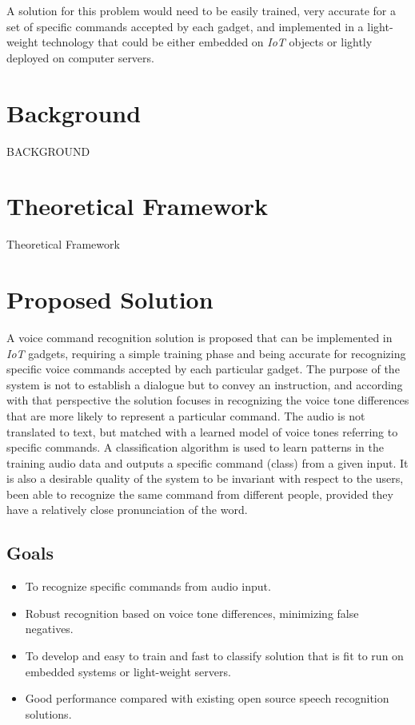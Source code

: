 \documentclass[anon]{CI}
\begin{document}
A solution for this problem would need to be easily trained, very accurate for a set of specific commands accepted by each gadget, and implemented in a light-weight technology that could be either embedded on \emph{IoT} objects or lightly deployed on computer servers.

\section{Background}
BACKGROUND

\section{Theoretical Framework}
Theoretical Framework 


\section{Proposed Solution}

A voice command recognition solution is proposed that can be implemented in \emph{IoT} gadgets, requiring a simple training phase and being accurate for recognizing specific voice commands accepted by each particular gadget. The purpose of the system is not to establish a dialogue but to convey an instruction, and according with that perspective the solution focuses in recognizing the voice tone differences that are more likely to represent a particular command. The audio is not translated to text, but matched with a learned model of voice tones referring to specific commands. A classification algorithm is used to learn patterns in the training audio data and outputs a specific command (class) from a given input. It is also a desirable quality of the system to be invariant with respect to the users, been able to recognize the same command from different people, provided they have a relatively close pronunciation of the word.

\subsection{Goals}
\begin{itemize}
	\item To recognize specific commands from audio input.
	\item Robust recognition based on voice tone differences, minimizing false negatives.
	\item To develop and easy to train and fast to classify solution that is fit to run on embedded systems or light-weight servers.
	\item Good performance compared with existing open source speech 
recognition solutions.
\end{itemize}
\end{document}
